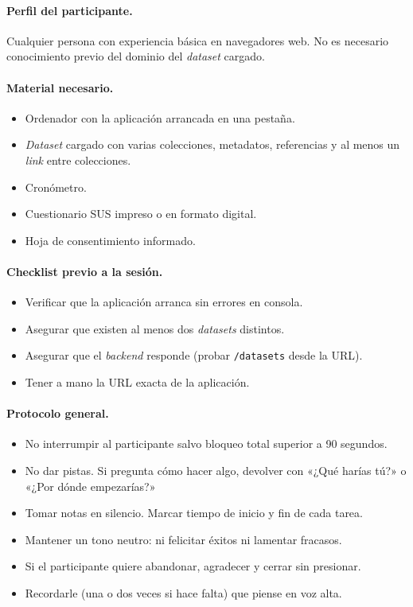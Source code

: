 \paragraph{Perfil del participante.}
Cualquier persona con experiencia básica en navegadores web. No es necesario conocimiento
previo del dominio del \textit{dataset} cargado.

\paragraph{Material necesario.}
\begin{itemize}
\item Ordenador con la aplicación arrancada en una pestaña.
\item \textit{Dataset} cargado con varias colecciones, metadatos, referencias y al menos
  un \textit{link} entre colecciones.
\item Cronómetro.
\item Cuestionario SUS impreso o en formato digital.
\item Hoja de consentimiento informado.
\end{itemize}

\paragraph{Checklist previo a la sesión.}
\begin{itemize}
\item Verificar que la aplicación arranca sin errores en consola.
\item Asegurar que existen al menos dos \textit{datasets} distintos.
\item Asegurar que el \textit{backend} responde (probar \texttt{/datasets} desde la URL).
\item Tener a mano la URL exacta de la aplicación.
\end{itemize}

\paragraph{Protocolo general.}
\begin{itemize}
\item No interrumpir al participante salvo bloqueo total superior a 90 segundos.
\item No dar pistas. Si pregunta cómo hacer algo, devolver con «¿Qué harías tú?» o
  «¿Por dónde empezarías?»
\item Tomar notas en silencio. Marcar tiempo de inicio y fin de cada tarea.
\item Mantener un tono neutro: ni felicitar éxitos ni lamentar fracasos.
\item Si el participante quiere abandonar, agradecer y cerrar sin presionar.
\item Recordarle (una o dos veces si hace falta) que piense en voz alta.
\end{itemize}

